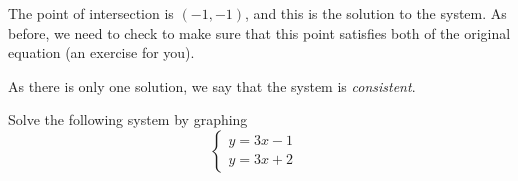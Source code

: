 \begin{myProof}
	The point of intersection is $(-1,-1)$, and this is the solution to the system. As before, 
	we need to check to make sure that this point satisfies both of the original equation (an exercise for you).
																																									
	As there is only one solution, we say that the system is {\em consistent}.
\end{myProof}
																											
\begin{myexample}
Solve the following system by graphing
\begin{equation}\label{eq:thirdsystem}
	\begin{cases}
		y		=	3x-1 &   \\
		y		=	3x+2 &   
	\end{cases}
\end{equation}
{}
\end{myexample}
																											
